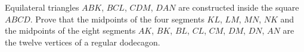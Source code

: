 Equilateral triangles $ABK$, $BCL$, $CDM$, $DAN$ are constructed inside the square $ABCD$. Prove that the midpoints of the four segments $KL$, $LM$, $MN$, $NK$ and the midpoints of the eight segments $AK$, $BK$, $BL$, $CL$, $CM$, $DM$, $DN$, $AN$ are the twelve vertices of a regular dodecagon.
